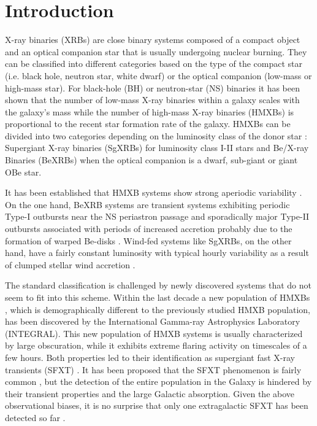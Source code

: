 \documentclass[a4paper,fleqn,usenatbib]{mnras}
\begin{document}
\section{Introduction}
\label{sec-intro}

X-ray binaries (XRBs) are close binary systems composed of a compact object and an optical companion star that is usually undergoing nuclear burning.
They can be classified into different categories based on the type of the compact star (i.e. black hole, neutron star, white dwarf) or the 
optical companion (low-mass or high-mass star). For black-hole (BH) or neutron-star (NS) binaries it has been shown that the number of low-mass X-ray binaries within a galaxy scales with the galaxy's mass \citep{2004MNRAS.349..146G} while the number of high-mass X-ray binaries (HMXBs) is proportional to the recent star formation rate of the galaxy.
HMXBs can be divided into two categories depending on the luminosity class of the donor star \citep[for a detailed review see ][]{2011Ap&SS.332....1R}: 
Supergiant X-ray binaries (SgXRBs) for luminosity class I-II stars and Be/X-ray Binaries (BeXRBs) when the optical companion is a dwarf, sub-giant or giant OBe star. 

It has been established that HMXB systems show strong aperiodic variability \citep{1990A&A...230..103B}.
On the one hand, BeXRB systems are transient systems exhibiting periodic Type-I outbursts near the NS periastron passage and sporadically major Type-II outbursts associated with periods of increased accretion probably due to the formation of warped Be-disks \citep{2013PASJ...65...41O}. 
Wind-fed systems like SgXRBs, on the other hand, have a fairly constant luminosity with typical hourly variability as a result of clumped stellar wind accretion \citep[e.g.][]{2012MNRAS.421.2820O,2014A&A...563A..70M}.

The standard classification is challenged by newly discovered systems that do not seem to fit into this scheme. 
Within the last decade a new population of HMXBs \citep{2016ApJS..223...15B}, which is demographically different to the previously studied HMXB population, has been discovered by the International Gamma-ray Astrophysics Laboratory (INTEGRAL).
This new population of HMXB systems is usually characterized by large obscuration, while it exhibits extreme flaring activity on timescales of a few hours. 
Both properties led to their identification as supergiant fast X-ray transients (SFXT) \citep{2006ESASP.604..165N,2017arXiv171003943S}. It has been proposed that the SFXT phenomenon is fairly common \citep{2014A&A...568A..76D}, but the detection of the entire population in the Galaxy is hindered by their transient properties and the large Galactic absorption. Given the above observational biases, it is no surprise that only one extragalactic SFXT has been detected so far \citep[IC\,10\,X-2, ][]{2014ApJ...789...64L}. 
\end{document}
